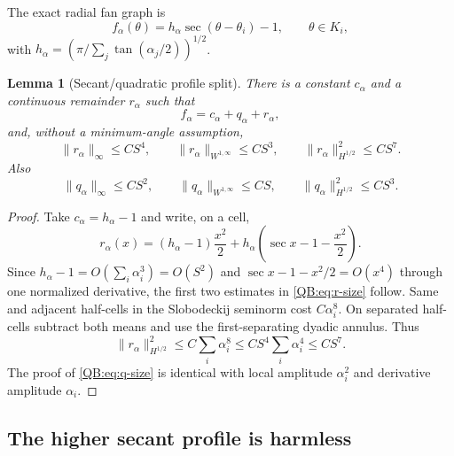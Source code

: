 \documentclass[11pt]{amsart}
\numberwithin{equation}{section}
\newtheorem{lemma}[theorem]{Lemma}
\theoremstyle{definition}
\theoremstyle{remark}
\begin{document}
The exact radial fan graph is
\begin{equation}\label{QB:eq:f}
 f_\alpha(\theta)=h_\alpha\sec(\theta-\theta_i)-1,
 \qquad \theta\in K_i,
\end{equation}
with
$h_\alpha=(\pi/\sum_j\tan(\alpha_j/2))^{1/2}$.

\begin{lemma}[Secant/quadratic profile split]
\label{QB:lem:split}
There is a constant $c_\alpha$ and a continuous remainder $r_\alpha$ such
that
\begin{equation}\label{QB:eq:split}
 f_\alpha=c_\alpha+q_\alpha+r_\alpha,
\end{equation}
and, without a minimum-angle assumption,
\begin{equation}\label{QB:eq:r-size}
 \|r_\alpha\|_\infty\le CS^4,
 \qquad \|r_\alpha\|_{W^{1,\infty}}\le CS^3,
 \qquad \|r_\alpha\|_{H^{1/2}}^2\le CS^7.
\end{equation}
Also
\begin{equation}\label{QB:eq:q-size}
 \|q_\alpha\|_\infty\le CS^2,
 \qquad \|q_\alpha\|_{W^{1,\infty}}\le CS,
 \qquad \|q_\alpha\|_{H^{1/2}}^2\le CS^3.
\end{equation}
\end{lemma}

\begin{proof}
Take $c_\alpha=h_\alpha-1$ and write, on a cell,
\begin{equation*}
 r_\alpha(x)
 =(h_\alpha-1)\frac{x^2}{2}
 +h_\alpha\left(\sec x-1-\frac{x^2}{2}\right).
\end{equation*}
Since $h_\alpha-1=O(\sum_i\alpha_i^3)=O(S^2)$ and
$\sec x-1-x^2/2=O(x^4)$ through one normalized derivative, the first two
estimates in \eqref{QB:eq:r-size} follow.  Same and adjacent half-cells in the
Slobodeckij seminorm cost $C\alpha_i^8$.  On separated half-cells subtract
both means and use the first-separating dyadic annulus.  Thus
\begin{equation*}
 \|r_\alpha\|_{H^{1/2}}^2
 \le C\sum_i\alpha_i^8
 \le CS^4\sum_i\alpha_i^4\le CS^7.
\end{equation*}
The proof of \eqref{QB:eq:q-size} is identical with local amplitude
$\alpha_i^2$ and derivative amplitude $\alpha_i$.
\end{proof}

\subsection{The higher secant profile is harmless}
\end{document}
